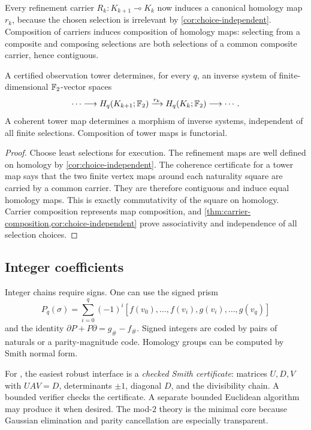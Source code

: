 Every refinement carrier $R_k:K_{k+1}\multimap K_k$ now induces a canonical homology map $r_k$, because the chosen selection is irrelevant by \cref{cor:choice-independent}.  Composition of carriers induces composition of homology maps: selecting from a composite and composing selections are both selections of a common composite carrier, hence contiguous.

\begin{theorem}
\label{thm:tower-homology}
A certified observation tower determines, for every $q$, an inverse system of finite-dimensional $\mathbb{F}_{2}$-vector spaces
\[
  \cdots\longrightarrow H_q(K_{k+1};\mathbb{F}_{2})
  \xrightarrow{r_k}
  H_q(K_k;\mathbb{F}_{2})
  \longrightarrow\cdots.
\]
A coherent tower map determines a morphism of inverse systems, independent of all finite selections.  Composition of tower maps is functorial.
\end{theorem}

\begin{proof}
Choose least selections for execution.  The refinement maps are well defined on homology by \cref{cor:choice-independent}.  The coherence certificate for a tower map says that the two finite vertex maps around each naturality square are carried by a common carrier.  They are therefore contiguous and induce equal homology maps.  This is exactly commutativity of the square on homology.  Carrier composition represents map composition, and \cref{thm:carrier-composition,cor:choice-independent} prove associativity and independence of all selection choices.
\end{proof}

\subsection{Integer coefficients}

Integer chains require signs.  One can use the signed prism
\[
  P_q(\sigma)=\sum_{i=0}^{q}(-1)^i
  [f(v_0),\ldots,f(v_i),g(v_i),\ldots,g(v_q)]
\]
and the identity $\partial P+P\partial=g_\#-f_\#$.  Signed integers are coded by pairs of naturals or a parity-magnitude code.  Homology groups can be computed by Smith normal form.

For \ipra, the easiest robust interface is a \emph{checked Smith certificate}: matrices $U,D,V$ with $UAV=D$, determinants $\pm1$, diagonal $D$, and the divisibility chain.  A bounded verifier checks the certificate.  A separate bounded Euclidean algorithm may produce it when desired.  The mod-$2$ theory is the minimal core because Gaussian elimination and parity cancellation are especially transparent.

